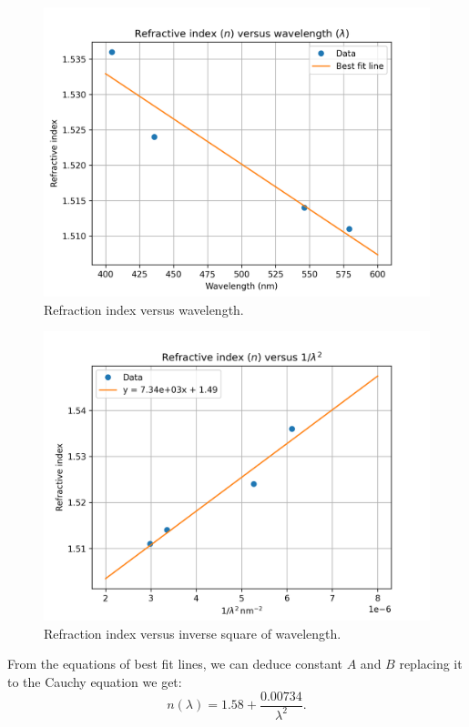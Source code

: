 \documentclass[10pt]{article}
\begin{document}
\begin{figure}[ht]
    \centering
    \includegraphics[scale=0.7]{figures/f2.png}
    \caption{Refraction index versus wavelength.}
    \label{fig:2}
\end{figure}

\begin{figure}[ht]
    \centering
    \includegraphics[scale=0.7]{figures/f3.png}
    \caption{Refraction index versus inverse square of wavelength.}
    \label{fig:3}
\end{figure}

From the equations of best fit lines, we can deduce constant $A$ and $B$ replacing it to the Cauchy equation we get: 
\begin{equation}
    n(\lambda) = 1.58 + \frac{0.00734}{\lambda^2}.
\end{equation}
\FloatBarrier %
 
\end{document}
